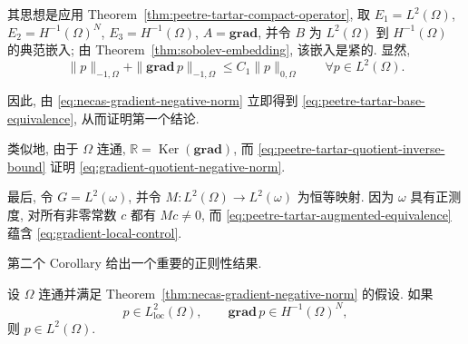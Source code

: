 \begin{Proof}
其思想是应用 Theorem~\ref{thm:peetre-tartar-compact-operator}, 取
$E_1=L^2(\Omega)$, $E_2=H^{-1}(\Omega)^N$, $E_3=H^{-1}(\Omega)$,
$A=\mathbf{grad}$, 并令 $B$ 为 $L^2(\Omega)$ 到 $H^{-1}(\Omega)$ 的典范嵌入;
由 Theorem~\ref{thm:sobolev-embedding}, 该嵌入是紧的. 显然,
\[
\|p\|_{-1,\Omega}+\|\mathbf{grad}\,p\|_{-1,\Omega}
\leq C_1\|p\|_{0,\Omega}\qquad\forall p\in L^2(\Omega).
\]

因此, 由 \eqref{eq:necas-gradient-negative-norm} 立即得到
\eqref{eq:peetre-tartar-base-equivalence}, 从而证明第一个结论.

类似地, 由于 $\Omega$ 连通, $\mathbb R=\operatorname{Ker}(\mathbf{grad})$, 而
\eqref{eq:peetre-tartar-quotient-inverse-bound} 证明 \eqref{eq:gradient-quotient-negative-norm}.

最后, 令 $G=L^2(\omega)$, 并令 $M:L^2(\Omega)\to L^2(\omega)$ 为恒等映射.
因为 $\omega$ 具有正测度, 对所有非零常数 $c$ 都有 $Mc\neq0$, 而
\eqref{eq:peetre-tartar-augmented-equivalence} 蕴含 \eqref{eq:gradient-local-control}.
\end{Proof}

第二个 Corollary 给出一个重要的正则性结果.

\setcounter{statement}{1}
\renewcommand{\theHstatement}{corollary.\thesection.\arabic{statement}}
\begin{Corollary}\label{cor:local-l2-gradient-global-l2}
设 $\Omega$ 连通并满足 Theorem~\ref{thm:necas-gradient-negative-norm} 的假设. 如果
\[
p\in L^2_{\mathrm{loc}}(\Omega),\qquad\mathbf{grad}\,p\in H^{-1}(\Omega)^N,
\]
则 $p\in L^2(\Omega)$.
\end{Corollary}

